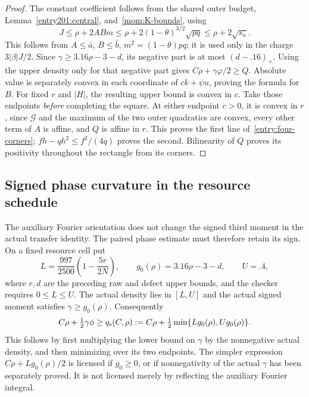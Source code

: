 \begin{proof}
The constant coefficient follows from the shared outer budget,
Lemma~\ref{entry201:central}, and~\eqref{mom:K-bounds}, using
\[
 J\le\rho+2ABm\le\rho+2(1-\theta)^{3/2}\sqrt{pq}
       \le\rho+2\sqrt{s_u}.
\]
This follows from $A\le\bar a$, $B\le\bar b$, $m^2=(1-\theta)pq$;
it is used only in the charge $3|\beta|J/2$. Since $\gamma\ge3.16\rho-3-d$, its negative
part is at most $(d-.16)_+$. Using the upper density only for that negative
part gives $C\rho+\gamma\varphi/2\ge Q$. Absolute value is separately
convex in each coordinate of $ck+\psi u$, proving the formula for $B$.
For fixed $r$ and $|H|$, the resulting upper bound is convex in $c$.
Take those endpoints \emph{before} completing the square. At either
endpoint $c>0$, it is convex in $r$, since $\mathcal G$ and the maximum of the two outer quadratics are
convex, every other term of $A$ is affine, and $Q$ is affine in $r$. This proves the first line of~\eqref{entry:four-corners};
$fh-qh^2\le f^2/(4q)$ proves the second. Bilinearity of $Q$ proves
its positivity throughout the rectangle from its corners.

\end{proof}

\subsection{Signed phase curvature in the resource schedule}
\label{re:signed-phase-repair}
The auxiliary Fourier orientation does not change the signed third moment
in the actual transfer identity. The paired phase estimate must therefore
retain its sign. On a fixed resource cell put
\[
 L=\frac{997}{2500}\left(1-\frac{5r}{2N}\right),\qquad
 g_0(\rho)=3.16\rho-3-d,\qquad U=.4,
\]
where $r,d$ are the preceding raw and defect upper bounds, and the
checker requires $0\le L\le U$. The actual density lies in $[L,U]$
and the actual signed moment satisfies $\gamma\ge g_0(\rho)$. Consequently
\begin{equation}\label{re:sign-aware-price}
 C\rho+\tfrac12\gamma\phi
 \ge q_{\rm s}(C,\rho):=
 C\rho+\tfrac12\min\{L g_0(\rho),U g_0(\rho)\}.
\end{equation}
This follows by first multiplying the lower bound on $\gamma$ by the
nonnegative actual density, and then minimizing over its two endpoints.
The simpler expression $C\rho+Lg_0(\rho)/2$ is licensed if $g_0\ge0$,
or if nonnegativity of the actual $\gamma$ has been separately proved.
It is not licensed merely by reflecting the auxiliary Fourier integral.

